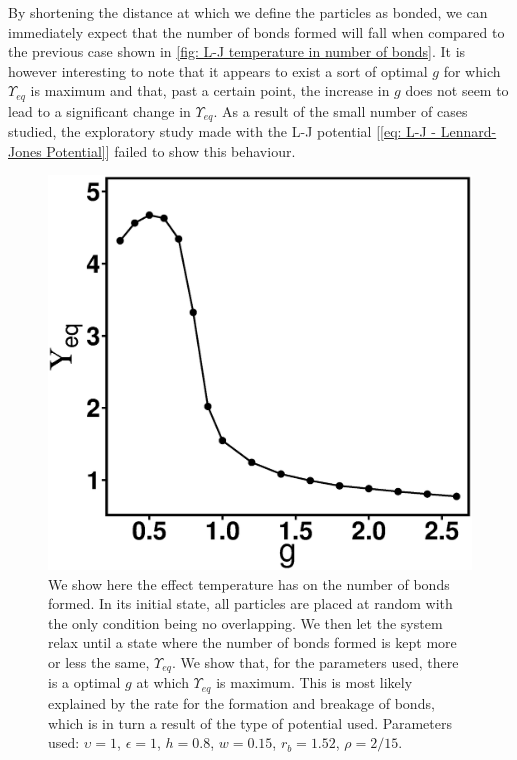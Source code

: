 \documentclass[../../main.tex]{subfiles}
\begin{document}
    By shortening the distance at which we define the particles as bonded, we can immediately expect that the number of bonds formed will fall when compared to the previous case shown in \cref{fig: L-J temperature in number of bonds}. It is however interesting to note that it appears to exist a sort of optimal $g$ for which $\Upsilon_{eq}$ is maximum and that, past a certain point, the increase in $g$ does not seem to lead to a significant change in $\Upsilon_{eq}$. As a result of the small number of cases studied, the exploratory study made with the L-J potential [\cref{eq: L-J - Lennard-Jones Potential}] failed to show this behaviour.
        \begin{figure}[h]
            \centering
            \includegraphics[scale=0.4]{Figures/np_g.eps}
            \caption{We show here the effect temperature has on the number of bonds formed. In its initial state, all particles are placed at random with the only condition being no overlapping. We then let the system relax until a state where the number of bonds formed is kept more or less the same, $\Upsilon_{eq}$. We show that, for the parameters used, there is a optimal $g$ at which $\Upsilon_{eq}$ is maximum. This is most likely explained by the rate for the formation and breakage of bonds, which is in turn a result of the type of potential used. Parameters used: $\upsilon = 1$, $\epsilon = 1$, $h = 0.8$, $w = 0.15$, $r_b = 1.52$, $\rho = 2/15$.}
            \label{fig: np2D - n bonds (g)}
        \end{figure}
    
\end{document}
